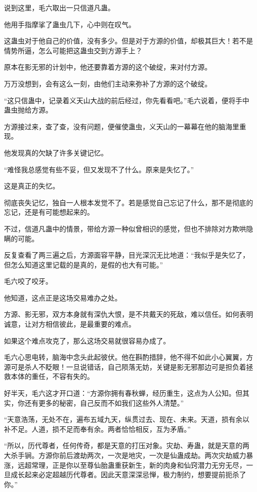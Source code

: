 \begin{this_body}
说到这里，毛六取出一只信道凡蛊。

他用手指摩挲了蛊虫几下，心中则在叹气。

这蛊虫对于他自己的价值，没有多少。但是对于方源的价值，却极其巨大！若不是情势所逼，怎么可能把这蛊虫交到方源手上？

原本在影无邪的计划中，他还要靠着方源的这个破绽，来对付方源。

万万没想到，会有这么一刻，由他们主动来弥补了方源的这个破绽。

“这只信蛊中，记录着义天山大战的前后经过，你先看看吧。”毛六说着，便将手中蛊虫抛给方源。

方源接过来，查了查，没有问题，便催使蛊虫，义天山的一幕幕在他的脑海里重现。

他发现真的欠缺了许多关键记忆。

“难怪我总感觉有些不妥，但又发现不了什么。原来是失忆了。”

这是真正的失忆。

彻底丧失记忆，独自一人根本发觉不了。若是感觉自己忘记了什么，那不是彻底的忘记，还是有可能想起来的。

不过，信道凡蛊中的情景，带给方源一种似曾相识的感觉，但也不排除对方欺哄隐瞒的可能。

反复查看了两三遍之后，方源面容平静，目光深沉无比地道：“我似乎是失忆了，但怎么知道这里记载的是真的，是假的也大有可能。”

毛六咬了咬牙。

他知道，这点正是这场交易难办之处。

方源、影无邪，双方本身就有深仇大恨，是不共戴天的死敌，难以信任。如何表明诚意，让对方相信彼此，是最重要的难点。

如果这个难点攻克了，那么这场交易就很容易办成了。

毛六心思电转，脑海中念头此起彼伏。他在斟酌措辞，他不得不如此小心翼翼，方源可是杀人不眨眼！一旦说错话，自己陨落无妨，关键是影无邪那边可是担负着拯救本体的重任，不容有失的。

好半天，毛六这才开口道：“方源你拥有春秋蝉，经历重生，这点为人公知。但其实，你还有更多的秘密，自己反而不如我们这些外人清楚。”

“天意浩荡，无处不在，遍布五域九天，纵贯过去、现在、未来。天道，损有余以补不足。人道，损不足而奉有余。两者恰恰相反，互为矛盾。”

“所以，历代尊者，任何传奇，都是天意的打压对象。灾劫、寿蛊，就是天意的两大杀手锏。方源你前后渡劫两次，一次是地灾，一次是仙蛊成劫。两次灾劫威力暴涨，远超常理，正是你以至尊仙胎蛊重获新生，新的肉身和仙窍潜力无穷无尽，一旦成长起来必定超越历代尊者。因此天意深深忌惮，极力制约，想要提前扼杀了你。”


\end{this_body}
